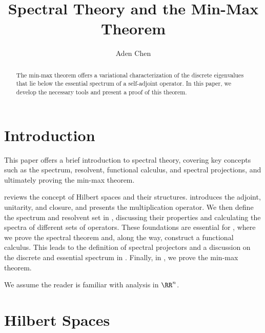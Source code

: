 \documentclass[oneside,reqno,letterpaper]{amsart}
\title[Spectral Theory and the Min-Max Theorem]{Spectral Theory and the Min-Max Theorem}
\author{Aden Chen}
\begin{document}
\begin{abstract}
  The min-max theorem offers a variational characterization of the discrete eigenvalues that lie below the essential spectrum of a self-adjoint operator. 
  In this paper, we develop the necessary tools and present a proof of this theorem. 
\end{abstract}

\maketitle

\tableofcontents




\section*{Introduction}
This paper offers a brief introduction to spectral theory, covering key concepts such as the spectrum, resolvent, functional calculus, and spectral projections, and ultimately proving the min-max theorem. 

 reviews the concept of Hilbert spaces and their structures. 
 introduces the adjoint, unitarity, and closure, and presents the multiplication operator. 
We then define the spectrum and resolvent set in , discussing their properties and calculating the spectra of different sets of operators. 
These foundations are essential for , where we prove the spectral theorem and, along the way, construct a functional calculus.
This leads to the definition of spectral projectors and a discussion on the discrete and essential spectrum in . 
Finally, in , we prove the min-max theorem. 

We assume the reader is familiar with analysis in \(\RR^n\). 






  
\section{Hilbert Spaces}
\label{sec:hilbert}
\end{document}
